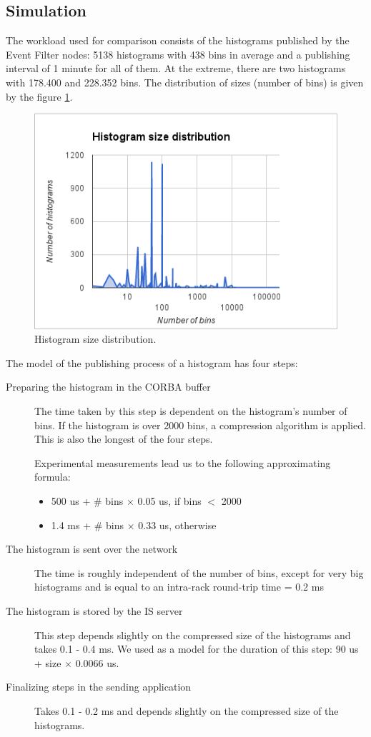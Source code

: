 \subsection{Simulation}
\label{section:simulation}
The workload used for comparison consists of the histograms published by the Event Filter nodes: 5138 histograms with 438 bins in average and a publishing interval of 1 minute for all of them. At the extreme, there are two histograms with 178.400 and 228.352 bins. The distribution of sizes (number of bins) is given by the figure \ref{fig:histosize}.

\begin{figure}[ht]
\centering
\includegraphics[scale=0.6]{Images/histo_distrib.png}
\caption{Histogram size distribution.}
\label{fig:histosize}
\end{figure}


The model of the publishing process of a histogram has four steps: 
\begin{description}
\item [Preparing the histogram in the CORBA buffer]
The time taken by this step is dependent on the histogram's number of bins. If the histogram is over 2000 bins, a compression algorithm is applied. This is also the longest of the four steps.

Experimental measurements lead us to the following approximating formula:
\begin{itemize}
\item 500 us + \# bins $\times$ 0.05 us, if bins $<$ 2000
\item 1.4 ms + \# bins $\times$ 0.33 us, otherwise 
\end{itemize}
\item[The histogram is sent over the network]
The time is roughly independent of the number of bins, except for very big histograms and is equal to an intra-rack round-trip time = 0.2 ms
\item[The histogram is stored by the IS server]
This step depends slightly on the compressed size of the histograms and takes 0.1 - 0.4 ms. We used as a model for the duration of this step: 90 us + size $\times$ 0.0066 us.
\item[Finalizing steps in the sending application]
Takes 0.1 - 0.2 ms and depends slightly on the compressed size of the histograms.
\end{description}

